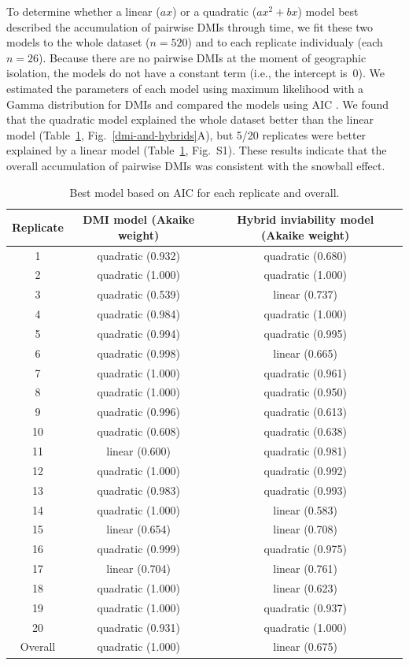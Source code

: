 \begin{doublespace}
To determine whether a linear ($ax$) or a quadratic ($ax^{2} + bx$) model
best described the accumulation of pairwise DMIs through time,
we fit these two models to the whole dataset ($n = 520$)
and to each replicate individualy (each $n = 26$).
%
Because there are no pairwise DMIs at the moment of geographic isolation,
the models do not have a constant term (i.e., the intercept is~0).
%
We estimated the parameters of each model using maximum likelihood
with a Gamma distribution for DMIs and compared the models using AIC
\citep{bol08}.
%
We found that the quadratic model explained the whole dataset better
than the linear model (Table~\ref{table:AIC}, Fig.~\ref{dmi-and-hybrids}A),
but 5/20 replicates were better explained by a linear model
(Table~\ref{table:AIC}, Fig.~S1).
%
These results indicate that the overall accumulation of pairwise DMIs
was consistent with the snowball effect.



\begin{table}
\centering
\begin{tabular}{ccc}
\hline
Replicate & DMI model (Akaike weight) &
  Hybrid inviability model (Akaike weight) \\
\hline
1   & quadratic (0.932) & quadratic (0.680) \\
2   & quadratic (1.000) & quadratic (1.000) \\
3   & quadratic (0.539) & linear (0.737) \\
4   & quadratic (0.984) & quadratic (1.000) \\
5   & quadratic (0.994) & quadratic (0.995) \\
6   & quadratic (0.998) & linear (0.665) \\
7   & quadratic (1.000) & quadratic (0.961) \\
8   & quadratic (1.000) & quadratic (0.950) \\
9   & quadratic (0.996) & quadratic (0.613) \\
10  & quadratic (0.608) & quadratic (0.638) \\
11  & linear (0.600)    & quadratic (0.981) \\
12  & quadratic (1.000) & quadratic (0.992) \\
13  & quadratic (0.983) & quadratic (0.993) \\
14  & quadratic (1.000) & linear (0.583) \\
15  & linear (0.654)    & linear (0.708) \\
16  & quadratic (0.999) & quadratic (0.975) \\
17  & linear (0.704)    & linear (0.761) \\
18  & quadratic (1.000) & linear (0.623) \\
19  & quadratic (1.000) & quadratic (0.937) \\
20  & quadratic (0.931) & quadratic (1.000) \\
\hline
Overall & quadratic (1.000) & linear (0.675) \\
\hline
\end{tabular}
\caption{Best model based on AIC for each replicate and overall.}
\label{table:AIC}
\end{table}




\end{doublespace}
